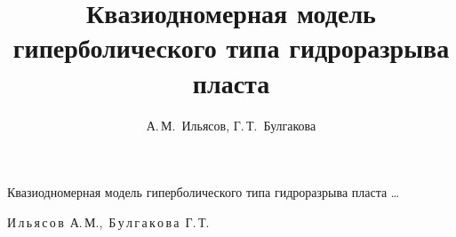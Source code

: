 


 

%

 

 \tableofcontents

 \newpage



\renewcommand{\firstpage}{99}

\renewcommand{\lastpage}{106}

 \newcommand{\bigcom}{\text{\usefont{T2A}{cmfib}{m}{n}\large{\raisebox{1pt}{,}}}} %
















\title{Квазиодномерная модель гиперболического типа гидроразрыва пласта}%

{Квазиодномерная модель гиперболического типа гидроразрыва пласта \dots}%



\author{А.\,М.~Ильясов, Г.\,Т.~Булгакова}%

{И\,л\,ь\,я\,с\,о\,в~А.\,М.,\ Б\,у\,л\,г\,а\,к\,о\,в\,а~Г.\,Т.}%







